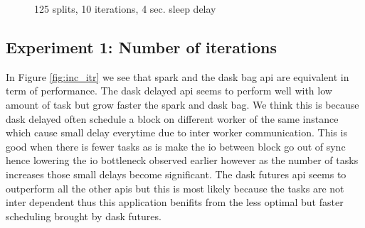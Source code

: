 \documentclass[11pt,a4paper]{article}
\begin{document}
\begin{figure}[htp]
    \centering
    
    \caption{125 splits, 10 iterations, 4 sec. sleep delay}
    \label{fig:inc_node}
\end{figure}



\subsection{Experiment 1: Number of iterations}
In Figure \ref{fig:inc_itr} we see that spark and the dask bag api are equivalent in
term of performance. The dask delayed api seems to perform well with low amount of
task but grow faster the spark and dask bag. We think this is because dask delayed
often schedule a block on different worker of the same instance which cause small
delay everytime due to inter worker communication. This is good when there is fewer
tasks as is make the io between block go out of sync hence lowering the io bottleneck
observed earlier however as the number of tasks increases those small delays become
significant. The dask futures api seems to outperform all the other apis but this is
most likely because the tasks are not inter dependent thus this application benifits
from the less optimal but faster scheduling brought by dask futures.
\end{document}
